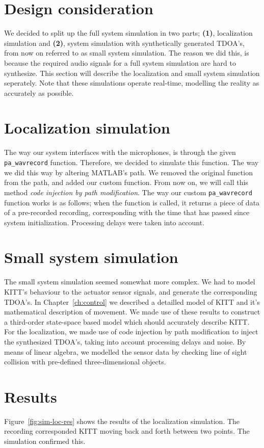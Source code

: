\documentclass[11pt,titlepage]{report}
\begin{document}
\section{Design consideration}
We decided to split up the full system simulation in two parts; \textbf{(1)}, localization simulation and \textbf{(2)}, system simulation with synthetically generated TDOA's, from now on referred to as small system simulation. The reason we did this, is because the required audio signals for a full system simulation are hard to synthesize. This section will describe the localization and small system simulation seperately. Note that these simulations operate real-time, modelling the reality as accurately as possible.

\section{Localization simulation}
The way our system interfaces with the microphones, is through the given \texttt{pa\_wavrecord} function. Therefore, we decided to simulate this function. The way we did this way by altering MATLAB's path. We removed the original function from the path, and added our custom function. From now on, we will call this method \textit{code injection by path modification}. The way our custom \texttt{pa\_wavrecord} function works is as follows; when the function is called, it returns a piece of data of a pre-recorded recording, corresponding with the time that has passed since system initialization. Processing delays were taken into account.

\section{Small system simulation}
The small system simulation seemed somewhat more complex. We had to model KITT's behaviour to the actuator sensor signals, and generate the corresponding TDOA's. In Chapter~\ref{ch:control} we described a detailled model of KITT and it's mathematical description of movement. We made use of these results to construct a third-order state-space based model which should accurately describe KITT. For the localization, we made use of code injection by path modification to inject the synthesized TDOA's, taking into account processing delays and noise. By means of linear algebra, we modelled the sensor data by checking line of sight collision with pre-defined three-dimensional objects.

\section{Results}
Figure~\ref{fig:sim-loc-res} shows the results of the localization simulation. The recording corresponded KITT moving back and forth between two points. The simulation confirmed this.
\end{document}
